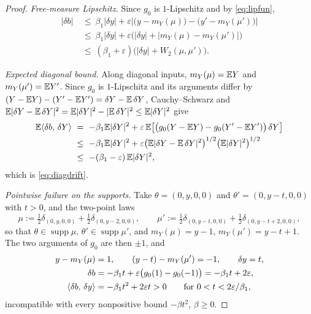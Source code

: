 \begin{proof}
\emph{Free-measure Lipschitz.} Since $g_0$ is $1$-Lipschitz and by \eqref{eq:lipfun},
\[
\begin{aligned}
|\delta b|&\ \le\ \beta_1|\delta y|
+\varepsilon\bigl|\bigl(y-m_Y(\mu)\bigr)-\bigl(y'-m_Y(\mu')\bigr)\bigr|\\
&\ \le\ \beta_1|\delta y|+\varepsilon\bigl(|\delta y|+|m_Y(\mu)-m_Y(\mu')|\bigr)\\
&\ \le\ (\beta_1+\varepsilon)\bigl(|\delta y|+W_2(\mu,\mu')\bigr).
\end{aligned}
\]

\emph{Expected diagonal bound.} Along diagonal inputs, $m_Y(\mu)=\mathbb{E} Y$ and
$m_Y(\mu')=\mathbb{E} Y'$. Since $g_0$ is $1$-Lipschitz and its arguments differ by
$(Y-\mathbb{E} Y)-(Y'-\mathbb{E} Y')=\delta Y-\mathbb{E}\,\delta Y$, Cauchy--Schwarz and
$\mathbb{E}|\delta Y-\mathbb{E}\,\delta Y|^2=\mathbb{E}|\delta Y|^2-|\mathbb{E}\,\delta Y|^2\le\mathbb{E}|\delta Y|^2$ give
\[
\begin{aligned}
\mathbb{E}\langle \delta b,\,\delta Y\rangle
&\ =\ -\beta_1\mathbb{E}|\delta Y|^2
+\varepsilon\,\mathbb{E}\bigl[\bigl(g_0(Y-\mathbb{E} Y)-g_0(Y'-\mathbb{E} Y')\bigr)\,\delta Y\bigr]\\
&\ \le\ -\beta_1\mathbb{E}|\delta Y|^2
+\varepsilon\bigl(\mathbb{E}|\delta Y-\mathbb{E}\,\delta Y|^2\bigr)^{1/2}\bigl(\mathbb{E}|\delta Y|^2\bigr)^{1/2}\\
&\ \le\ -(\beta_1-\varepsilon)\,\mathbb{E}|\delta Y|^2 ,
\end{aligned}
\]
which is \eqref{eq:diagdrift}.

\emph{Pointwise failure on the supports.} Take $\theta=(0,y,0,0)$ and
$\theta'=(0,y-t,0,0)$ with $t>0$, and the two-point laws
\[
\mu:=\tfrac12\delta_{(0,y,0,0)}+\tfrac12\delta_{(0,y-2,0,0)},\qquad
\mu':=\tfrac12\delta_{(0,y-t,0,0)}+\tfrac12\delta_{(0,y-t+2,0,0)},
\]
so that $\theta\in\operatorname{supp}\mu$, $\theta'\in\operatorname{supp}\mu'$, and
$m_Y(\mu)=y-1$, $m_Y(\mu')=y-t+1$. The two arguments of $g_0$ are then $\pm1$, and
\[
\begin{aligned}
y-m_Y(\mu)&=1, \qquad (y-t)-m_Y(\mu')=-1, \qquad \delta y=t,\\
\delta b&=-\beta_1t+\varepsilon\bigl(g_0(1)-g_0(-1)\bigr)=-\beta_1t+2\varepsilon,\\
\langle \delta b,\,\delta y\rangle&=-\beta_1t^2+2\varepsilon t>0
\qquad\text{for }0<t<2\varepsilon/\beta_1,
\end{aligned}
\]
incompatible with every nonpositive bound $-\beta t^2$, $\beta\ge0$.
\end{proof}


